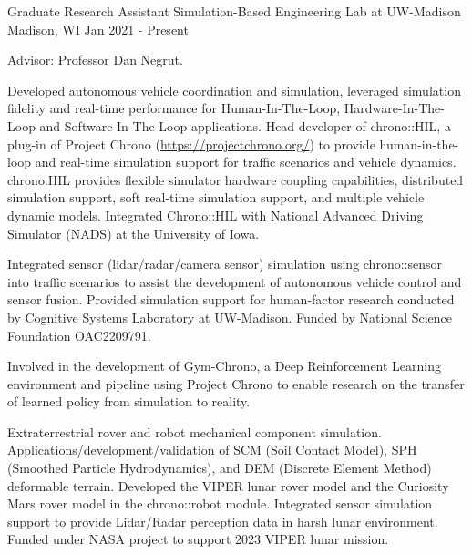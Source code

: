 

\begin{cventries}
	
  \cventry
	{Graduate Research Assistant} %
	{Simulation-Based Engineering Lab at UW-Madison} %
	{Madison, WI} %
	{Jan 2021 - Present} %
	{
		\begin{cvitems} %
			\item {Advisor: Professor Dan Negrut.}
			\item {Developed autonomous vehicle coordination and simulation, leveraged simulation fidelity and real-time performance for Human-In-The-Loop, Hardware-In-The-Loop and Software-In-The-Loop applications. Head developer of chrono::HIL, a plug-in of Project Chrono (\url{https://projectchrono.org/}) to provide human-in-the-loop and real-time simulation support for traffic scenarios and vehicle dynamics. chrono:HIL provides flexible simulator hardware coupling capabilities, distributed simulation support, soft real-time simulation support, and multiple vehicle dynamic models. Integrated Chrono::HIL with National Advanced Driving Simulator (NADS) at the University of Iowa.} 
			\item {Integrated sensor (lidar/radar/camera sensor) simulation using chrono::sensor into traffic scenarios to assist the development of autonomous vehicle control and sensor fusion. Provided simulation support for human-factor research conducted by Cognitive Systems Laboratory at UW-Madison. Funded by National Science Foundation OAC2209791.}
			\item {Involved in the development of Gym-Chrono, a Deep Reinforcement Learning environment and pipeline using Project Chrono to enable research on the transfer of learned policy from simulation to reality.}
			\item {Extraterrestrial rover and robot mechanical component simulation. Applications/development/validation of SCM (Soil Contact Model), SPH (Smoothed Particle Hydrodynamics), and DEM (Discrete Element Method) deformable terrain. Developed the VIPER lunar rover model and the Curiosity Mars rover model in the chrono::robot module. Integrated sensor simulation support to provide Lidar/Radar perception data in harsh lunar environment. Funded under NASA project to support 2023 VIPER lunar mission.}
		\end{cvitems}
	}


\end{cventries}
